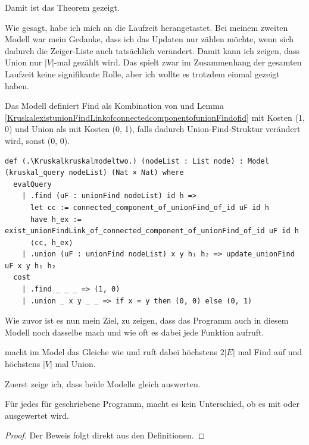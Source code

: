 Damit ist das Theorem gezeigt.

Wie gesagt, habe ich mich an die Laufzeit herangetastet.
Bei meinem zweiten Modell war mein Gedanke, dass ich das Updaten nur zählen möchte, wenn sich dadurch die Zeiger-Liste auch tatsächlich verändert.
Damit kann ich zeigen, dass Union nur $|V|$-mal gezählt wird.
Das spielt zwar im Zusammenhang der gesamten Laufzeit keine signifikante Rolle, aber ich wollte es trotzdem einmal gezeigt haben.

\begin{definition}[\Kruskalkruskalmodeltwo]
  Das Modell definiert Find als Kombination von \KruskalconnectedcomponentofunionFindofid und Lemma \ref{KruskalexistunionFindLinkofconnectedcomponentofunionFindofid} mit Kosten (1, 0)
  und Union als \KruskalupdateunionFind mit Kosten (0, 1), falls dadurch Union-Find-Struktur verändert wird, sonst (0, 0).
\end{definition}
\begin{lstlisting}
def (.\Kruskalkruskalmodeltwo.) (nodeList : List node) : Model (kruskal_query nodeList) (Nat × Nat) where
  evalQuery
    | .find (uF : unionFind nodeList) id h =>
      let cc := connected_component_of_unionFind_of_id uF id h
      have h_ex := exist_unionFindLink_of_connected_component_of_unionFind_of_id uF id h
      ⟨cc, h_ex⟩
    | .union (uF : unionFind nodeList) x y h₁ h₂ => update_unionFind uF x y h₁ h₂
  cost
    | .find _ _ _ => (1, 0)
    | .union _ x y _ _ => if x = y then (0, 0) else (0, 1)
\end{lstlisting}

Wie zuvor ist es nun mein Ziel, zu zeigen, dass das Programm auch in diesem Modell noch dasselbe mach und wie oft es dabei jede Funktion aufruft.

\begin{theorem}
    \Kruskalkruskalprog macht im Model \Kruskalkruskalmodeltwo das Gleiche wie \Kruskalkruskal und ruft dabei höchstens $2|E|$ mal Find auf und höchstens $|V|$ mal Union.
\end{theorem}

Zuerst zeige ich, dass beide Modelle gleich auswerten.

\begin{lemma}[\Kruskalevalkruskalmodeltwoeqevalkruskalmodelone]
  Für jedes für \Kruskalkruskalquery geschriebene Programm, macht es kein Unterschied, ob es mit \Kruskalkruskalmodelone oder \Kruskalkruskalmodeltwo ausgewertet wird.
\end{lemma}
\begin{proof}
  Der Beweis folgt direkt aus den Definitionen.
\end{proof}

